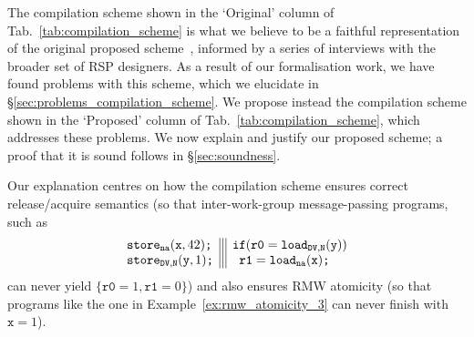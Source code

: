 \documentclass[svgnames,10pt]{sigplanconf}
\theoremstyle{definition}
\newcommand\na{{\tt na}}
\newcommand\sdv{{\tt DV}}
\begin{document}
The compilation scheme shown in the `Original' column of
Tab.~\ref{tab:compilation_scheme} is what we believe to be a faithful
representation of the original proposed scheme~\cite{orr+15}, informed by a series of interviews with
the broader set of RSP designers. As a result of our formalisation work, we
have found problems with this scheme, which we elucidate in
\S\ref{sec:problems_compilation_scheme}. We propose instead the
compilation scheme shown in the `Proposed' column of
Tab.~\ref{tab:compilation_scheme}, which addresses these problems.  We
now explain and justify our proposed scheme; a proof that it is sound
follows in \S\ref{sec:soundness}.

Our explanation centres on how the compilation scheme ensures correct
release/acquire semantics (so that inter-work-group message-passing programs, such as
\[
\begin{array}{l|||l}
\texttt{store}_{\na}(\texttt{x}, 42)\texttt{;} &
\texttt{if}(\texttt{r0} = \texttt{load}_{\sdv,\texttt{N}}(\texttt{y}))\\
\texttt{store}_{\sdv, \texttt{N}}(\texttt{y}, 1)\texttt{;} &
\texttt{~r1} = \texttt{load}_{\na}(\texttt{x})\texttt{;}
\end{array}
\]
can never yield $\{\texttt{r0}=1, \texttt{r1}=0\}$) and also ensures
RMW atomicity (so that programs
like the one in Example~\ref{ex:rmw_atomicity_3} can never finish with $\texttt{x}=1$).
\end{document}
